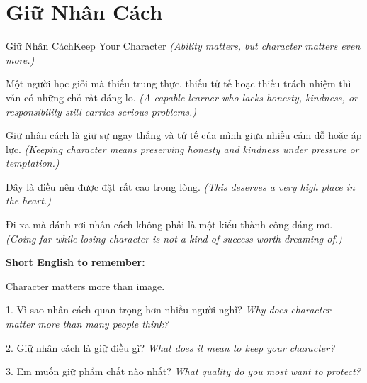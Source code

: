 \section{Giữ Nhân Cách}
\begin{truyen}{Giữ Nhân Cách}{Keep Your Character}
\textit{(Ability matters, but character matters even more.)}

Một người học giỏi mà thiếu trung thực, thiếu tử tế hoặc thiếu trách nhiệm thì vẫn có những chỗ rất đáng lo.
\textit{(A capable learner who lacks honesty, kindness, or responsibility still carries serious problems.)}

Giữ nhân cách là giữ sự ngay thẳng và tử tế của mình giữa nhiều cám dỗ hoặc áp lực.
\textit{(Keeping character means preserving honesty and kindness under pressure or temptation.)}

Đây là điều nên được đặt rất cao trong lòng.
\textit{(This deserves a very high place in the heart.)}
\end{truyen}

\begin{baihoc}
Đi xa mà đánh rơi nhân cách không phải là một kiểu thành công đáng mơ.
\textit{(Going far while losing character is not a kind of success worth dreaming of.)}
\end{baihoc}

\begin{ghinhoanh}
\textbf{Short English to remember:}

Character matters more than image.

\end{ghinhoanh}

\begin{tuhocnhanh}
1. Vì sao nhân cách quan trọng hơn nhiều người nghĩ? \textit{Why does character matter more than many people think?}

2. Giữ nhân cách là giữ điều gì? \textit{What does it mean to keep your character?}

3. Em muốn giữ phẩm chất nào nhất? \textit{What quality do you most want to protect?}
\end{tuhocnhanh}
\ngancach

